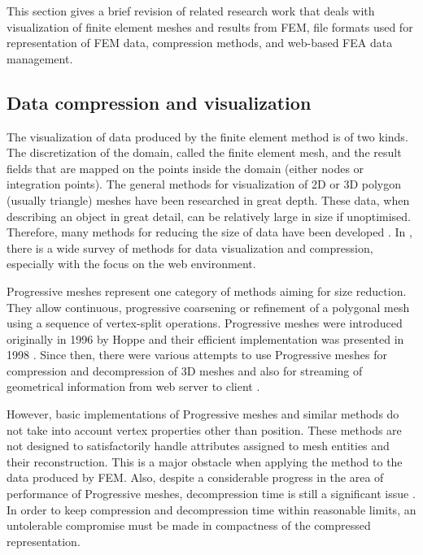 This section gives a brief revision of related research work that deals with visualization of finite element meshes and results from FEM, file formats used for representation of FEM data, compression methods, and web-based FEA data management.


\subsection{Data compression and visualization}

The visualization of data produced by the finite element method is of two kinds. The discretization of the domain, called the finite element mesh, and the result fields that are mapped on the points inside the domain (either nodes or integration points). The general methods for visualization of 2D or 3D polygon (usually triangle) meshes have been researched in great depth. These data, when describing an object in great detail, can be relatively large in size if unoptimised. Therefore, many methods for reducing the size of data have been developed \cite{Alliez2005}. In \cite{Evans2014}, there is a wide survey of methods for data visualization and compression, especially with the focus on the web environment.

Progressive meshes represent one category of methods aiming for size reduction. They allow continuous, progressive coarsening or refinement of a polygonal mesh using a sequence of vertex-split operations. Progressive meshes were introduced originally in 1996 by Hoppe \cite{Hoppe1996} and their efficient implementation was presented in 1998 \cite{Hoppe1998}. Since then, there were various attempts to use Progressive meshes for compression and decompression of 3D meshes \cite{Gudukbay2002, Valette2004, Valette2009, Lavoue2013} and also for streaming of geometrical information from web server to client \cite{Alliez2001, Maglo2012}.

However, basic implementations of Progressive meshes and similar methods do not take into account vertex properties other than position. These methods are not designed to satisfactorily handle attributes assigned to mesh entities and their reconstruction. This is a major obstacle when applying the method to the data produced by FEM. Also, despite a considerable progress in the area of performance of Progressive meshes, decompression time is still a significant issue \cite{Limper2013}. In order to keep compression and decompression time within reasonable limits, an untolerable compromise must be made in compactness of the compressed representation.

